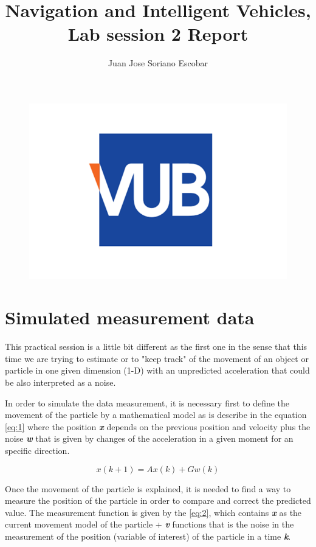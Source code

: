 \documentclass{article}
\begin{document}
        \begin{figure}
            \centering
            \includegraphics[width=0.5\linewidth]{./img/vub.png}
        \end{figure}
        \title{Navigation and Intelligent Vehicles, Lab session 2 Report}
        \author{Juan Jose Soriano Escobar }
        \maketitle
        \newpage

        \section{Simulated measurement data}
        
        This practical session is a little bit different as the first one in the sense that
        this time we are trying to estimate or to "keep track" of the movement of  an object
        or particle in one given dimension (1-D) with an unpredicted acceleration that could be
        also interpreted as a noise.
        
        In order to simulate the data measurement, it is necessary first to define the movement of
        the particle by a mathematical model as is describe in the equation \ref{eq:1} where the position
        \textbf{\textit{x}} depends on the previous position and velocity plus the noise \textbf{\textit{w}}
        that is given by changes of the acceleration in a given moment for an specific direction.

        \begin{equation}\label{eq:1}
            x(k + 1) = Ax(k) + Gw(k) 
        \end{equation}

        Once the movement of the particle is explained, it is needed to find a way to measure the position of 
        the particle in order to compare and correct the predicted value. The measurement function is given by
        the \ref{eq:2}, which contains \textbf{\textit{x}} as the current movement model of the particle + \textbf{\textit{v}}
        functions that is the noise in the measurement of the position (variable of interest) of the particle in a time 
        \textbf{\textit{k}}.
\end{document}
